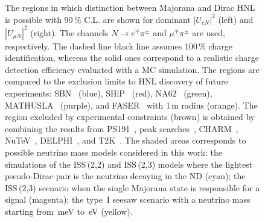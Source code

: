 \begin{figure}[t]
	\centering
	\resizebox{.48\textwidth}{!}{}
	\resizebox{.48\textwidth}{!}{}
	\caption[Sensitivity to distinction between Majorana and Dirac HNL]%
		{The regions in which distinction between Majorana and Dirac HNL is %
		possible with 90\,\% C.L. are shown for dominant $|U_{e N}|^2$ (left) and $|U_{\mu N}|^2$ (right).
		The channels $N \to e^\mp \pi^\pm$ and $\mu^\mp \pi^\pm$ are used, respectively.
		The dashed line black line assumes 100\,\% charge identification, %
		whereas the solid ones correspond to a realistic charge detection efficiency evaluated %
		with a MC simulation.
		The regions are compared to the exclusion limits to HNL discovery of future experiments: %
		SBN~\cite{Ballett:2016opr} (blue), SHiP~\cite{Alekhin:2015byh} (red), %
		NA62~\cite{Drewes:2018irr} (green), MATHUSLA~\cite{Curtin:2018mvb} (purple), %
		and FASER~\cite{Kling:2018wct} with 1\,m radius (orange).
		The region excluded by experimental constraints (brown) is obtained by combining the results from
		PS191~\cite{Bernardi:1985ny, Bernardi:1987ek}, %
		peak searches~\cite{Artamonov:2014urb, Britton:1992pg, Britton:1992xv, Aguilar-Arevalo:2017vlf, Aguilar-Arevalo:2019owf}, %
		CHARM~\cite{Vilain:1994vg}, NuTeV~\cite{Vaitaitis:1999wq}, DELPHI~\cite{Abreu:1996pa}, and T2K~\cite{Abe:2019kgx}.
		The shaded areas corresponds to possible neutrino mass models considered in this work: %
		the simulations of the ISS\,(2,2) and ISS\,(2,3) models where the lightest %
		pseudo-Dirac pair is the neutrino decaying in the ND (cyan); %
		the ISS\,(2,3) scenario when the single Majorana state is responsible for a signal (magenta); %
		the type~I seesaw scenario with a neutrino mass starting from \,meV to \,eV (yellow).}
	\label{fig:lnv}
\end{figure}

